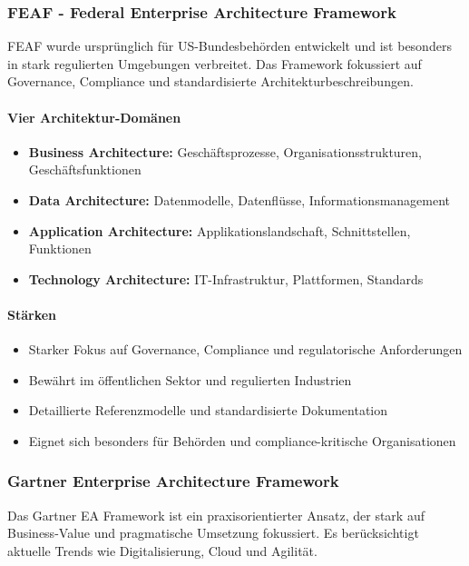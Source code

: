 \subsubsection{FEAF - Federal Enterprise Architecture Framework}
\label{subsubsec:feaf}

FEAF wurde ursprünglich für US-Bundesbehörden entwickelt und ist besonders in stark regulierten Umgebungen verbreitet. Das Framework fokussiert auf Governance, Compliance und standardisierte Architekturbeschreibungen.

\paragraph{Vier Architektur-Domänen}
\begin{itemize}
\item \textbf{Business Architecture:} Geschäftsprozesse, Organisationsstrukturen, Geschäftsfunktionen
\item \textbf{Data Architecture:} Datenmodelle, Datenflüsse, Informationsmanagement
\item \textbf{Application Architecture:} Applikationslandschaft, Schnittstellen, Funktionen
\item \textbf{Technology Architecture:} IT-Infrastruktur, Plattformen, Standards
\end{itemize}

\paragraph{Stärken}
\begin{itemize}
\item Starker Fokus auf Governance, Compliance und regulatorische Anforderungen
\item Bewährt im öffentlichen Sektor und regulierten Industrien
\item Detaillierte Referenzmodelle und standardisierte Dokumentation
\item Eignet sich besonders für Behörden und compliance-kritische Organisationen
\end{itemize}

\subsubsection{Gartner Enterprise Architecture Framework}
\label{subsubsec:gartner}

Das Gartner EA Framework ist ein praxisorientierter Ansatz, der stark auf Business-Value und pragmatische Umsetzung fokussiert. Es berücksichtigt aktuelle Trends wie Digitalisierung, Cloud und Agilität.

